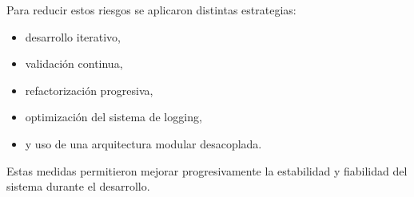 Para reducir estos riesgos se aplicaron distintas estrategias:

\begin{itemize}
    \item desarrollo iterativo,
    \item validación continua,
    \item refactorización progresiva,
    \item optimización del sistema de logging,
    \item y uso de una arquitectura modular desacoplada.
\end{itemize}

Estas medidas permitieron mejorar progresivamente la estabilidad y fiabilidad del sistema durante el desarrollo.